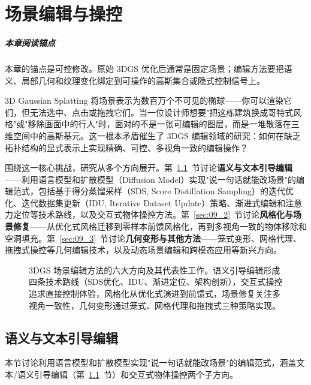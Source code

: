 \chapter{场景编辑与操控}
\label{ch:09}

\paragraph*{本章阅读锚点}
本章的锚点是可控修改。原始 3DGS 优化后通常是固定场景；编辑方法要把语义、局部几何和纹理变化绑定到可操作的高斯集合或隐式控制信号上。


3D Gaussian Splatting 将场景表示为数百万个不可见的椭球——你可以渲染它们，但无法选中、点击或拖拽它们。当一位设计师想要"把这栋建筑换成哥特式风格"或"移除画面中的行人"时，面对的不是一张可编辑的图层，而是一堆散落在三维空间中的高斯基元。这一根本矛盾催生了 3DGS 编辑领域的研究：如何在缺乏拓扑结构的显式表示上实现精确、可控、多视角一致的编辑操作？

围绕这一核心挑战，研究从多个方向展开。第~\ref{sec:09_1}~节讨论\textbf{语义与文本引导编辑}——利用语言模型和扩散模型（Diffusion Model）实现"说一句话就能改场景"的编辑范式，包括基于得分蒸馏采样（SDS, Score Distillation Sampling）的迭代优化、迭代数据集更新（IDU, Iterative Dataset Update）策略、渐进式编辑和注意力定位等技术路线，以及交互式物体操控方法。第~\ref{sec:09_2}~节讨论\textbf{风格化与场景修复}——从优化式风格迁移到零样本前馈风格化，再到多视角一致的物体移除和空洞填充。第~\ref{sec:09_3}~节讨论\textbf{几何变形与其他方法}——笼式变形、网格代理、拖拽式操控等几何编辑技术，以及动态场景编辑和跨模态应用等新兴方向。

\begin{figure}[htbp]
\centering
\resizebox{0.95\textwidth}{!}{}
\caption{3DGS 场景编辑方法的六大方向及其代表性工作。语义引导编辑形成四条技术路线（SDS优化、IDU、渐进定位、架构创新），交互式操控追求直接控制体验，风格化从优化式演进到前馈式，场景修复关注多视角一致性，几何变形通过笼式、网格代理和拖拽式三种策略实现。}
\label{fig:ch09_taxonomy}
\end{figure}

\section{语义与文本引导编辑}
\label{sec:09_1}

本节讨论利用语言模型和扩散模型实现"说一句话就能改场景"的编辑范式，涵盖文本/语义引导编辑（第~\ref{sec:09_1}~节）和交互式物体操控两个子方向。

